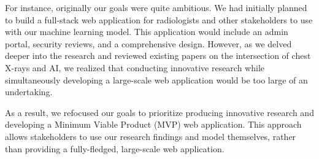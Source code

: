 \documentclass{article}
\begin{document}
\begin{enumerate}
    For instance, originally our goals were quite ambitious. We had initially planned to build a full-stack web application for radiologists and other stakeholders to use with our machine learning model. This application would include an admin portal, security reviews, and a comprehensive design. However, as we delved deeper into the research and reviewed existing papers on the intersection of chest X-rays and AI, we realized that conducting innovative research while simultaneously developing a large-scale web application would be too large of an undertaking.
    
    As a result, we refocused our goals to prioritize producing innovative research and developing a Minimum Viable Product (MVP) web application. This approach allows stakeholders to use our research findings and model themselves, rather than providing a fully-fledged, large-scale web application.
    

\end{enumerate}  
\end{document}
